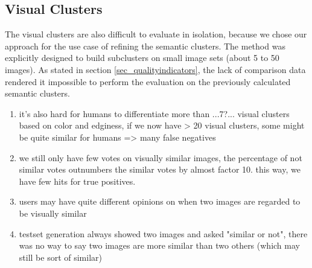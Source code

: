 \subsection{Visual Clusters}

The visual clusters are also difficult to evaluate in isolation, because we chose our approach for the use case of refining the semantic clusters. The method was explicitly designed to build subclusters on small image sets (about 5 to 50 images). As stated in section \ref{sec_qualityindicators}, the lack of comparison data rendered it impossible to perform the evaluation on the previously calculated semantic clusters.
\begin{enumerate}
\item it's also hard for humans to differentiate more than ...7?... visual clusters based on color and edginess, if we now have > 20 visual clusters, some might be quite similar for humans => many false negatives
\item we still only have few votes on visually similar images, the percentage of not similar votes outnumbers the similar votes by almost factor 10. this way, we have few hits for true positives.
\item users may have quite different opinions on when two images are regarded to be visually similar
\item testset generation always showed two images and asked "similar or not", there was no way to say two images are more similar than two others (which may still be sort of similar)
\end{enumerate}
